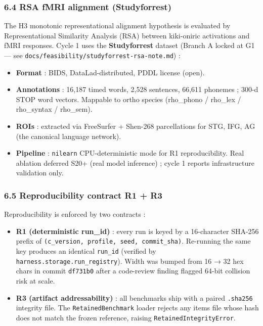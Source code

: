\documentclass[
]{article}
\providecommand{\tightlist}{%
  \setlength{\itemsep}{0pt}\setlength{\parskip}{0pt}}
\begin{document}
\subsubsection{6.4 RSA fMRI alignment
(Studyforrest)}\label{rsa-fmri-alignment-studyforrest}

The H3 monotonic representational alignment hypothesis is evaluated by
Representational Similarity Analysis (RSA) between kiki-oniric
activations and fMRI responses. Cycle 1 uses the \textbf{Studyforrest}
dataset (Branch A locked at G1 --- see
\texttt{docs/feasibility/studyforrest-rsa-note.md}) :

\begin{itemize}
\tightlist
\item
  \textbf{Format} : BIDS, DataLad-distributed, PDDL license (open).
\item
  \textbf{Annotations} : 16,187 timed words, 2,528 sentences, 66,611
  phonemes ; 300-d STOP word vectors. Mappable to ortho species
  (rho\_phono / rho\_lex / rho\_syntax / rho\_sem).
\item
  \textbf{ROIs} : extracted via FreeSurfer + Shen-268 parcellations for
  STG, IFG, AG (the canonical language network).
\item
  \textbf{Pipeline} : \texttt{nilearn} CPU-deterministic mode for R1
  reproducibility. Real ablation deferred S20+ (real model inference) ;
  cycle 1 reports infrastructure validation only.
\end{itemize}

\subsubsection{6.5 Reproducibility contract R1 +
R3}\label{reproducibility-contract-r1-r3}

Reproducibility is enforced by two contracts :

\begin{itemize}
\tightlist
\item
  \textbf{R1 (deterministic run\_id)} : every run is keyed by a
  16-character SHA-256 prefix of
  \texttt{(c\_version,\ profile,\ seed,\ commit\_sha)}. Re-running the
  same key produces an identical \texttt{run\_id} (verified by
  \texttt{harness.storage.run\_registry}). Width was bumped from 16 → 32
  hex chars in commit \texttt{df731b0} after a code-review finding
  flagged 64-bit collision risk at scale.
\item
  \textbf{R3 (artifact addressability)} : all benchmarks ship with a
  paired \texttt{.sha256} integrity file. The \texttt{RetainedBenchmark}
  loader rejects any items file whose hash does not match the frozen
  reference, raising \texttt{RetainedIntegrityError}.
\end{itemize}
\end{document}
